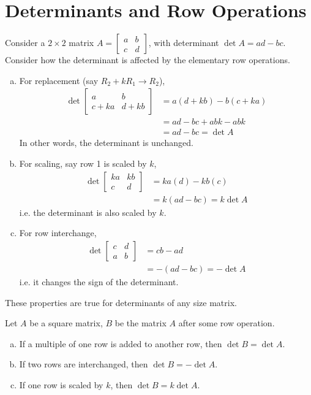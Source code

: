 \documentclass[letterpaper,12pt]{article}
\begin{document}
\section*{Determinants and Row Operations}
Consider a $2 \times 2$ matrix $A = \begin{bmatrix} a & b \\ c & d \end{bmatrix}$, with determinant $\det{A} = ad - bc$. Consider how the determinant is affected by the elementary row operations.

\begin{enumerate}[(a)]
    \item For replacement (say $R_2 + kR_1 \rightarrow R_2$),
    \begin{align*}
        \det{\begin{bmatrix} a & b \\ c + ka & d + kb \end{bmatrix}} & = a(d + kb) - b(c + ka) \\
        & = ad - bc + abk - abk \\
        & = ad - bc = \det{A}
    \end{align*}
    In other words, the determinant is unchanged.
    \item For scaling, say row 1 is scaled by $k$,
    \begin{align*}
        \det{\begin{bmatrix} ka & kb \\ c & d \end{bmatrix}} & = ka(d) - kb(c) \\
        & = k(ad - bc) = k \det{A}
    \end{align*}
    i.e. the determinant is also scaled by $k$.
    \item For row interchange,
    \begin{align*}
        \det{\begin{bmatrix} c & d \\ a & b \end{bmatrix}} & = cb - ad \\
        & = -(ad - bc) = -\det{A}
    \end{align*}
    i.e. it changes the sign of the determinant.
\end{enumerate}

These properties are true for determinants of any size matrix.

\begin{theorem}
Let $A$ be a square matrix, $B$ be the matrix $A$ after some row operation.
\begin{enumerate}[(a)]
    \item If a multiple of one row is added to another row, then $\det{B} = \det{A}$.
    \item If two rows are interchanged, then $\det{B} = -\det{A}$.
    \item If one row is scaled by $k$, then $\det{B} = k\det{A}$.
\end{enumerate}
\end{theorem}
\end{document}
